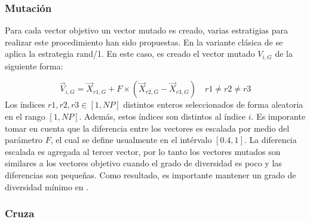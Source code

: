 \subsubsection{Mutación}

Para cada vector objetivo un vector mutado es creado, varias estratigias para realizar este procedimiento han sido propuestas.
%
En la variante clásica de \DE{} se aplica la estrategia rand/1.
%
En este caso, es creado el vector mutado $V_{i,G}$ de la siguiente forma:

\begin{equation}\label{eqn:mutation}
\vec{V}_{i,G} = \vec{X}_{r1, G} + F \times (\vec{X}_{r2, G} - \vec{X}_{r3, G}) \quad r1 \neq r2 \neq r3
\end{equation}
%
Los índices $r1, r2, r3 \in [1,NP]$ distintos enteros seleccionados de forma aleatoria en el rango $[1, NP]$.
%
Además, estos índices son distintos al índice $i$.
%
Es imporante tomar en cuenta que la diferencia entre los vectores es escalada por medio del parámetro $F$, el cual se define usualmente en el intérvalo $[0.4, 1]$.
%
La diferencia escalada es agregada al tercer vector, por lo tanto los vectores mutados son similares a los vectores objetivo cuando el grado de diversidad es poco y las diferencias son pequeñas.
%
Como resultado, es importante mantener un grado de diversidad mínimo en \DE{}.

\subsubsection{Cruza}

